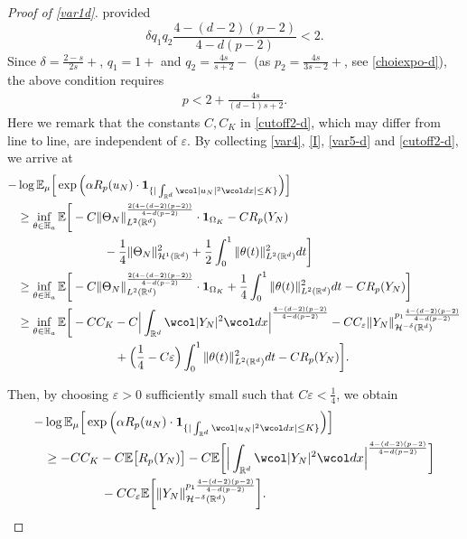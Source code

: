\documentclass[%
11pt,  reqno]{amsart}
\theoremstyle{remarkstyle}
\newcommand{\1}{\hspace{0.2mm}\text{I}\hspace{0.2mm}}
\newcommand{\noi}{\noindent}
\newcommand{\R}{\mathbb{R}}
\newcommand{\E}{\mathbb{E}}
\newcommand{\al}{\alpha}
\newcommand{\dl}{\delta}
\newcommand{\eps}{\varepsilon}
\newcommand{\wick}[1]{\wcol#1\wcol}
\renewcommand{\O}{\Omega}
\newcommand{\ind}{\mathbf 1}
\numberwithin{equation}{section}
\numberwithin{theorem}{section}
\begin{document}
\begin{proof}[Proof of \eqref{var1d}]
		\noi
		provided 
		\[
		\delta q_1 q_2 \frac{4-(d-2)(p-2)}{4-d(p-2)} <2.
		\]
		Since $\delta =\frac{2-s}{2s}+$, $q_1=1+$ and $q_2 = \frac{4s}{s+2}-$ (as $p_2=\frac{4s}{3s-2}+$, see \eqref{choiexpo-d}), the above condition requires 
		\begin{align} \label{cond-p}
			p<2+\frac{4s}{(d-1)s+2}.
		\end{align} 
		Here we remark that the constants $C,C_K$ in \eqref{cutoff2-d}, which may differ from line to line, are independent of $\eps$. By collecting \eqref{var4}, \eqref{I}, \eqref{var5-d} and \eqref{cutoff2-d}, 
		we arrive at
		\begin{align}
			\label{var70-d}
			\begin{split}
				- & \log  \E_{\mu}  \Big[ \exp \Big(\al R_p(u_N) \cdot  \ind_{\{ | \int_{\R^d} \wick{|u_N |^2} dx| \le K\}}  \Big)\Big]\\
				& \ge \inf_{\theta \in \mathbb{H}_a} \E \bigg[ - C \| \Theta_N \|_{L^2({\R^d})}^{\frac{2(4-(d-2)(p-2))}{4-d(p-2)}} \cdot \ind_{\O_K}
				- C  R_p(Y_N) \\
				& \hphantom{XXXXXXXX} 
				- \frac14 \| \Theta_N \|_{\mathcal H^1 ({\R^d})}^2 + \frac12 \int_0^1 
				\| \theta (t) \|_{L^2(\R^d)}^2 dt \bigg]\\
				& \ge \inf_{\theta \in \mathbb{H}_a}  \E \bigg[  - C  \| \Theta_N \|_{L^2({\R^d})}^{\frac{2(4-(d-2)(p-2))}{4-d(p-2)}} \cdot \ind_{\O_K} + \frac14  \int_0^1 
				\| \theta (t) \|_{L^2(\R^d)}^2 dt 
				- C R_p(Y_N) \bigg]\\
				& \ge \inf_{\theta \in \mathbb{H}_a}  \E \bigg[ - C C_K  - C   \Big| \int_{{\R^d}} \wick{|Y_N|^2}  dx   \Big|^{\frac{4-(d-2)(p-2)}{4-d(p-2)}} - C C_\eps    \| Y_N \|_{\mathcal H^{-\dl} ({\R^d})}^{p_1 \frac{4-(d-2)(p-2)}{4-d(p-2)}}  \\
				& \hphantom{XXXXXXXXX} 	+ \Big( \frac14 - C \eps \Big) \int_0^1 
				\| \theta (t) \|_{L^2(\R^d)}^2 dt 
				- C R_p(Y_N)  \bigg].
			\end{split}
		\end{align}
		
		\noi
		Then, by choosing $\eps >0$ sufficiently small such that  $C \eps  < \frac14$, we obtain 
		\begin{align}
			\begin{split}
				- & \log  \E_{\mu}  \Big[ \exp \Big(\al R_p(u_N) \cdot  \ind_{\{ | \int_{\R^d} \wick{|u_N |^2} dx| \le K\}}  \Big)\Big]\\
				& \ge  - C C_K   - C  \E\big[ R_p(Y_N) \big]  
				- C  \E \bigg[ \Big| \int_{{\R^d}} \wick{|Y_N|^2}  dx   \Big|^{\frac{4-(d-2)(p-2)}{4-d(p-2)}} \bigg]  \\
				& \hphantom{XXXXX} - C C_\eps  \E \bigg[   \| Y_N \|_{\mathcal H^{-\dl} ({\R^d})}^{p_1 \frac{4-(d-2)(p-2)}{4-d(p-2)}}  \bigg].
			\end{split}
			\label{var71-d}
		\end{align}
		

\end{proof}
\end{document}
